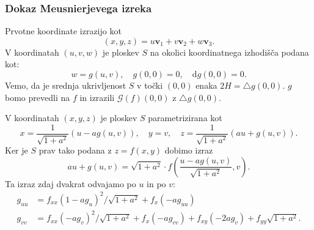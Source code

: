 \documentclass[8pt]{beamer}
\theoremstyle{definition}
\theoremstyle{remark}
\theoremstyle{plain}
\numberwithin{equation}{section}  %
\begin{document}
\begin{frame}
    \frametitle{Dokaz Meusnierjevega izreka}

    Prvotne koordinate izrazijo kot 
    \begin{equation*}
        (x, y, z)=u \mathbf{v}_1+v \mathbf{v}_2+w \mathbf{v}_3.
    \end{equation*}
    V koordinatah $(u,v,w)$ je ploskev $S$ na okolici koordinatnega izhodišča podana kot:
    \begin{equation*}
        w=g(u, v), \quad g(0,0)=0, \quad \mathrm{d} g(0,0)=0.
    \end{equation*}
    \pause 
    Vemo, da je srednja ukrivljenost $S$ v točki $(0,0)$ enaka $2H=\bigtriangleup g(0,0)$. $g$ bomo prevedli na $f$ in izrazili $\mathscr{G}(f)(0,0)$ z $\bigtriangleup g(0,0)$. 
    \pause 
    \vspace{0.8em}

    V koordinatah $(x, y, z)$ je ploskev $S$ parametrizirana kot 
    \begin{equation*}
        x=\frac{1}{\sqrt{1+a^2}}(u-a g(u, v)), \quad y=v, \quad z=\frac{1}{\sqrt{1+a^2}}(a u+g(u, v)) .
    \end{equation*}
    Ker je $S$ prav tako podana z $z=f(x, y)$ dobimo izraz
    \begin{equation*}
        a u+g(u, v)=\sqrt{1+a^2} \cdot f\left(\frac{u-a g(u, v)}{\sqrt{1+a^2}}, v\right) .
    \end{equation*}
    \pause 
    Ta izraz zdaj dvakrat odvajamo po $u$ in po $v$: 
    \begin{align*}
        g_{u u} & =f_{x x}\left(1-a g_u\right)^2 / \sqrt{1+a^2}+f_x\left(-a g_{u u}\right) \\
        g_{v v} & =f_{x x}\left(-a g_v\right)^2 / \sqrt{1+a^2}+f_x\left(-a g_{v v}\right)+f_{x y}\left(-2 a g_v\right)+f_{y y} \sqrt{1+a^2} .
    \end{align*}
    
\end{frame}
\end{document}
